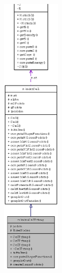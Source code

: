 \begin{figure}[H]
\begin{center}
\leavevmode
\includegraphics[height=400pt]{classmknix_1_1CellTriang__coll__graph}
\end{center}
\end{figure}

